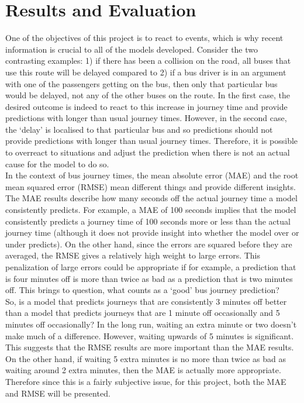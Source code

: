 \section{Results and Evaluation}

One of the objectives of this project is to react to events, which is why recent information is crucial to all of the models developed. Consider the two contrasting examples: 1) if there has been a collision on the road, all buses that use this route will be delayed compared to 2) if a bus driver is in an argument with one of the passengers getting on the bus, then only that particular bus would be delayed, not any of the other buses on the route. In the first case, the desired outcome is indeed to react to this increase in journey time and provide predictions with longer than usual journey times. However, in the second case, the `delay' is localised to that particular bus and so predictions should not provide predictions with longer than usual journey times. Therefore, it is possible to overreact to situations and adjust the prediction when there is not an actual cause for the model to do so. \\

In the context of bus journey times, the mean absolute error (MAE) and the root mean squared error (RMSE) mean different things and provide different insights. The MAE results describe how many seconds off the actual journey time a model consistently predicts. For example, a MAE of 100 seconds implies that the model consistently predicts a journey time of 100 seconds more or less than the actual journey time (although it does not provide insight into whether the model over or under predicts). On the other hand, since the errors are squared before they are averaged, the RMSE gives a relatively high weight to large errors. This penalization of large errors could be appropriate if for example, a prediction that is four minutes off is more than twice as bad as a prediction that is two minutes off. This brings to question, what counts as a `good' bus journey prediction? \\ 

So, is a model that predicts journeys that are consistently 3 minutes off better than a model that predicts journeys that are 1 minute off occasionally and 5 minutes off occasionally? In the long run, waiting an extra minute or two doesn't make much of a difference. However, waiting upwards of 5 minutes is significant. This suggests that the RMSE results are more important than the MAE results. On the other hand, if waiting 5 extra minutes is no more than twice as bad as waiting around 2 extra minutes, then the MAE is actually more appropriate. Therefore since this is a fairly subjective issue, for this project, both the MAE and RMSE will be presented. 

